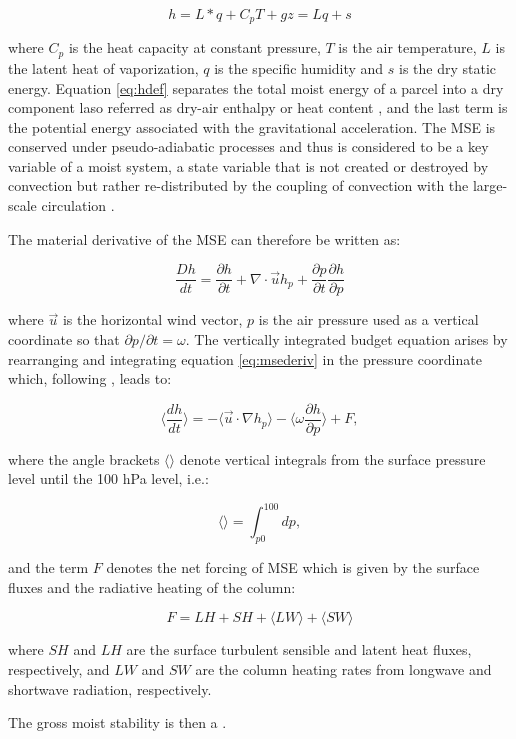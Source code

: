 \begin{equation}
h=L*q+C_pT+gz=Lq+s
\label{eq:hdef}
\end{equation}

\noindent where $C_p$ is the heat capacity at constant pressure, $T$ is the air temperature, $L$ is the latent heat of vaporization, $q$ is the specific humidity and $s$ is the dry static energy. 
Equation \ref{eq:hdef} separates the total moist energy of a parcel into a dry component laso referred as dry-air enthalpy or heat content \citep{emanuel2007quasi}, and the last term is the potential energy associated with the gravitational acceleration. 
The MSE is conserved under pseudo-adiabatic processes and thus is considered to be a key variable of a moist system, a state variable that is not created or destroyed by convection but rather re-distributed by the coupling of convection with the large-scale circulation \citep{chou2004,emanuel2007quasi}.

The material derivative of the MSE can therefore be written as:

\begin{equation}
\frac{Dh}{dt}=\frac{\partial h}{\partial t}+\nabla\cdot{\vec{u}h}_p+\frac{\partial p}{\partial t}\frac{\partial h}{\partial p}
\label{eq:msederiv}
\end{equation}

\noindent where $\vec{u}$ is the horizontal wind vector, $p$ is the air pressure used as a vertical coordinate so that $\partial p/\partial t = \omega$. 
The vertically integrated budget equation arises by rearranging and integrating equation \ref{eq:msederiv} in the pressure coordinate which, following \cite{annamalai2020}, leads to:

\begin{equation}
\Bigg\langle \frac{d h}{dt} \Bigg\rangle=-\Bigg\langle \vec{u}\cdot\nabla h _p \Bigg\rangle -\Bigg\langle \omega\frac{\partial h}{\partial p}\Bigg\rangle + F,
\label{eq:msebudget}
\end{equation}

\noindent where the angle brackets $\langle \rangle$ denote vertical integrals from the surface pressure level until the 100 hPa level, i.e.:

\begin{equation}
\Bigg\langle \Bigg\rangle= \int_{p0}^{100} dp, 
\end{equation}

\noindent and the term $F$ denotes the net forcing of MSE which is given by the surface fluxes and the radiative heating of the column:

\begin{equation}
F= LH+SH+\langle LW \rangle + \langle  SW \rangle
\end{equation}

\noindent where $SH$ and $LH$ are the surface turbulent sensible and latent heat fluxes, respectively, and $LW$ and $SW$ are the column heating rates from longwave and shortwave radiation, respectively.

The gross moist stability is then a .